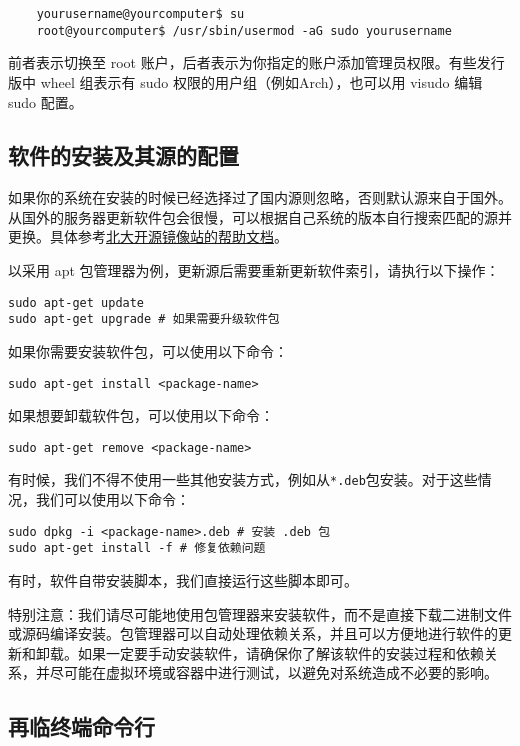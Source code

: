 \documentclass[../main.tex]{subfiles}
\begin{document}
\begin{verbatim}
    yourusername@yourcomputer$ su
    root@yourcomputer$ /usr/sbin/usermod -aG sudo yourusername
\end{verbatim}

前者表示切换至 root 账户，后者表示为你指定的账户添加管理员权限。有些发行版中 wheel 组表示有 sudo 权限的用户组（例如Arch），也可以用 visudo 编辑 sudo 配置。

\subsection{软件的安装及其源的配置}

如果你的系统在安装的时候已经选择过了国内源则忽略，否则默认源来自于国外。从国外的服务器更新软件包会很慢，可以根据自己系统的版本自行搜索匹配的源并更换。具体参考\href{https://mirrors.pku.edu.cn/Help}{北大开源镜像站的帮助文档}。

以采用 apt 包管理器为例，更新源后需要重新更新软件索引，请执行以下操作：

\begin{verbatim}
sudo apt-get update
sudo apt-get upgrade # 如果需要升级软件包
\end{verbatim}

如果你需要安装软件包，可以使用以下命令：
\begin{verbatim}
sudo apt-get install <package-name>
\end{verbatim}

如果想要卸载软件包，可以使用以下命令：
\begin{verbatim}
sudo apt-get remove <package-name>
\end{verbatim}

有时候，我们不得不使用一些其他安装方式，例如从\texttt{*.deb}包安装。对于这些情况，我们可以使用以下命令：

\begin{verbatim}
sudo dpkg -i <package-name>.deb # 安装 .deb 包
sudo apt-get install -f # 修复依赖问题
\end{verbatim}

有时，软件自带安装脚本，我们直接运行这些脚本即可。

特别注意：我们请尽可能地使用包管理器来安装软件，而不是直接下载二进制文件或源码编译安装。包管理器可以自动处理依赖关系，并且可以方便地进行软件的更新和卸载。如果一定要手动安装软件，请确保你了解该软件的安装过程和依赖关系，并尽可能在虚拟环境或容器中进行测试，以避免对系统造成不必要的影响。

\subsection{再临终端命令行}
\end{document}
